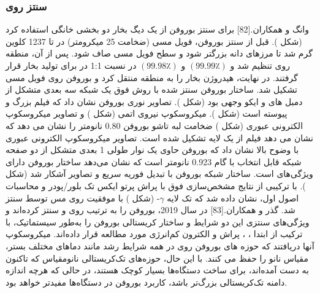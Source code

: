 \subsubsection{سنتز روی }
وانگ و همکاران.\cite{taiSynthesisAtomicallyThin2015}[82] برای سنتز بوروفن از یک دیگ بخار دو بخشی  خانگی استفاده کرد (شکل ). قبل از سنتز بوروفن، فویل مسی (ضخامت 25 میکرومتر) در  تا 1237 کلوین گرم شد تا مرزهای دانه بزرگتر شود و سطح فویل مسی صاف شود. پس از آن، منطقه  روی  تنظیم شد و  $(99.99٪)$ و  $(99.98٪)$ در نسبت 1:1 در  برای تولید بخار  قرار گرفتند. در نهایت، هیدروژن بخار  را به منطقه  منتقل کرد و بوروفن روی فویل مسی تشکیل شد. ساختار بوروفن سنتز شده با روش فوق یک شبکه سه بعدی متشکل از دمبل های  و  ایکو وجهی بود (شکل ). تصاویر نوری بوروفن نشان داد که فیلم بزرگ و پیوسته است (شکل ). میکروسکوپ نیروی اتمی  (شکل ) و تصاویر میکروسکوپ الکترونی عبوری  (شکل ) ضخامت لبه تاشو بوروفن 0.80 نانومتر را نشان می دهد که نشان می دهد فیلم از یک لایه تشکیل شده است. تصاویر میکروسکوپ الکترونی عبوری با وضوح بالا  نشان داد که بوروفن حاوی یک نوار طولی 1 بعدی متشکل از دو صفحه شبکه قابل انتخاب با گام 0.923 نانومتر است که نشان می‌دهد ساختار بوروفن دارای ویژگی‌های  است. ساختار شبکه بوروفن با تبدیل فوریه سریع  و تصاویر  آشکار شد (شکل ). با ترکیبی از نتایج مشخص‌سازی فوق با پراش پرتو ایکس تک بلور/پودر و محاسبات اصول اول، نشان داده شد که تک لایه $\gamma$- (شکل ) با موفقیت روی مس توسط  سنتز شد. گذر و همکاران.\cite{wuLargeareaSinglecrystalSheets2019}[83] در سال 2019، بوروفن را به ترتیب روی  و  سنتز کرده‌اند و ویژگی‌های سنتزی این دو شرایط و ساختار کریستالی بوروفن را به‌طور سیستماتیک، با ترکیب از ابتدا ، ، پراش و الکترون کم‌انرژی مورد مطالعه قرار داده‌اند. میکروسکوپ آنها دریافتند که حوزه های بوروفن روی  در همه شرایط رشد مانند دماهای مختلف بستر، مقیاس نانو را حفظ می کنند. با این حال، حوزه‌های تک‌کریستالی نانومقیاس که تاکنون به دست آمده‌اند، برای ساخت دستگاه‌ها بسیار کوچک هستند، در حالی که هرچه اندازه دامنه تک‌کریستالی بزرگ‌تر باشد، کاربرد بوروفن در دستگاه‌ها مفیدتر خواهد بود.

